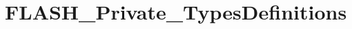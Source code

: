 \hypertarget{group___f_l_a_s_h___private___types_definitions}{\section{F\-L\-A\-S\-H\-\_\-\-Private\-\_\-\-Types\-Definitions}
\label{group___f_l_a_s_h___private___types_definitions}
}
